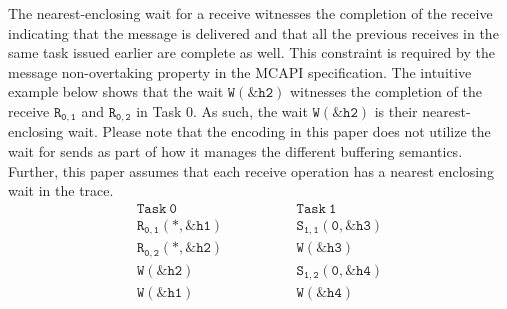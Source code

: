 The nearest-enclosing wait for a receive witnesses the completion of
the receive indicating that the message is delivered and that all the
previous receives in the same task issued earlier are complete as
well. This constraint is required by the message non-overtaking
property in the MCAPI specification. The intuitive example below shows
that the wait $\mathtt{W{(\&h2)}}$ witnesses the completion of the
receive $\mathtt{R_{0,1}}$ and $\mathtt{R_{0,2}}$ in Task 0. As such,
the wait $\mathtt{W{(\&h2)}}$ is their nearest-enclosing wait. Please
note that the encoding in this paper does not utilize the wait for
sends as part of how it manages the different buffering semantics. Further, this paper assumes that each receive operation has a nearest enclosing wait in the trace.
\[
\begin{array}{l|l}
\;\;\;\;\;\;\;\;\mathtt{Task\ 0}\;\;\;\;\;\;\;\; & \;\;\;\;\;\;\;\; \mathtt{Task\ 1}\;\;\;\;\;\;\;\; \\
\hline
\;\;\;\;\;\;\;\;\mathtt{R_{0,1}(*,\&h1)}\;\;\;\;\;\;\;\; & \;\;\;\;\;\;\;\; \mathtt{S_{1,1}(0,\&h3)}\;\;\;\;\;\;\;\; \\
\;\;\;\;\;\;\;\;\mathtt{R_{0,2}(*,\&h2)}\;\;\;\;\;\;\;\; & \;\;\;\;\;\;\;\; \mathtt{W{(\&h3)}}\;\;\;\;\;\;\;\; \\
\;\;\;\;\;\;\;\;\mathtt{W{(\&h2)}}\;\;\;\;\;\;\;\; & \;\;\;\;\;\;\;\; \mathtt{S_{1,2}(0,\&h4)}\;\;\;\;\;\;\;\; \\
\;\;\;\;\;\;\;\;\mathtt{W{(\&h1)}}\;\;\;\;\;\;\;\; & \;\;\;\;\;\;\;\; \mathtt{W{(\&h4)}}\;\;\;\;\;\;\;\; \\
\end{array}
\]


